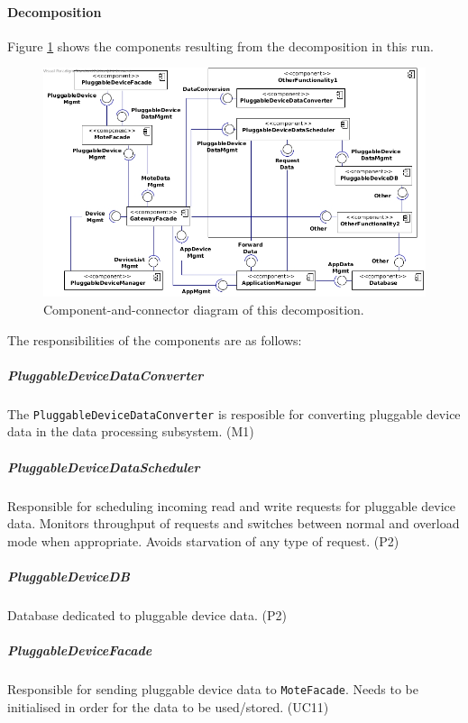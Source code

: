     \paragraph{Decomposition}
        Figure \ref{fig:it2-cc_main} shows the components resulting from the
        decomposition in this run.

        \begin{figure}[!h]
        	\centering
            \includegraphics[width=1\textwidth]{component-diagram-2}
        	\caption{Component-and-connector diagram of this decomposition.}
            \label{fig:it2-cc_main}
        \end{figure}

        \noindent The responsibilities of the components are as follows:

    \subparagraph{PluggableDeviceDataConverter}
        The \texttt{PluggableDeviceDataConverter} is resposible for converting
        pluggable device data in the data processing subsystem. (M1)

    \subparagraph{PluggableDeviceDataScheduler}
        Responsible for scheduling incoming read and write requests for
        pluggable device data. Monitors throughput of requests and switches
        between normal and overload mode when appropriate. Avoids starvation
        of any type of request. (P2)

    \subparagraph{PluggableDeviceDB}
        Database dedicated to pluggable device data. (P2)

    \subparagraph{PluggableDeviceFacade}
        Responsible for sending pluggable device data to \texttt{MoteFacade}.
        Needs to be initialised in order for the data to be used/stored. (UC11)


